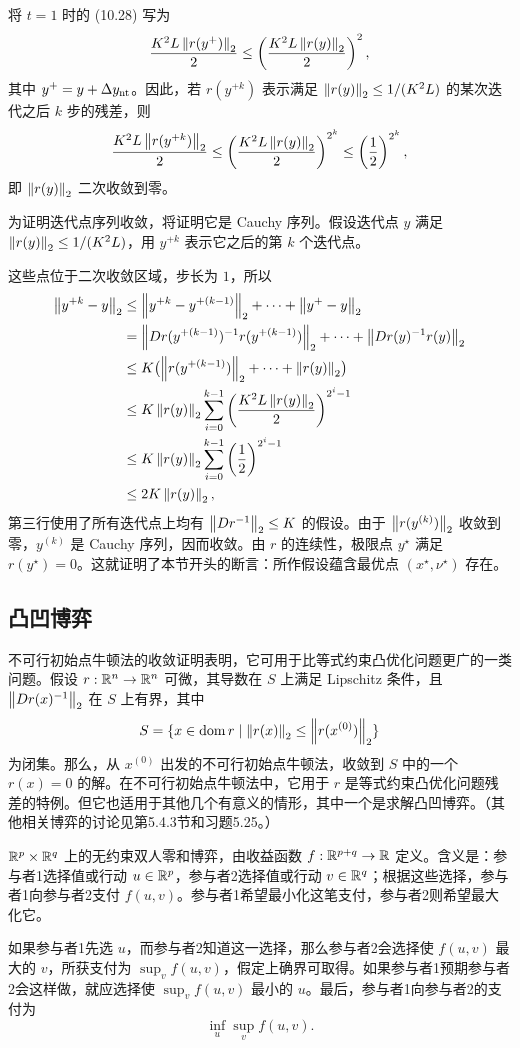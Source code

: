 将 $t=1$ 时的 (10.28) 写为
\[\frac{K^2L\left\lVert r(y^+)\right\rVert_2}{2}\le\left(\frac{K^2L\left\lVert r(y)\right\rVert_2}{2}\right)^2,\]
其中 $y^+=y+\Delta y_{\rm nt}$。因此，若 $r(y^{+k})$ 表示满足 $\left\lVert r(y)\right\rVert_2\le1/(K^2L)$ 的某次迭代之后 $k$ 步的残差，则
\[\frac{K^2L\left\lVert r(y^{+k})\right\rVert_2}{2}\le\left(\frac{K^2L\left\lVert r(y)\right\rVert_2}{2}\right)^{2^k}\le\left(\frac12\right)^{2^k},\]
即 $\left\lVert r(y)\right\rVert_2$ 二次收敛到零。

为证明迭代点序列收敛，将证明它是 Cauchy 序列。假设迭代点 $y$ 满足 $\left\lVert r(y)\right\rVert_2\le1/(K^2L)$，用 $y^{+k}$ 表示它之后的第 $k$ 个迭代点。

这些点位于二次收敛区域，步长为 $1$，所以
\[\begin{aligned}
\left\lVert y^{+k}-y\right\rVert_2&\le\left\lVert y^{+k}-y^{+(k-1)}\right\rVert_2+\cdots+\left\lVert y^+-y\right\rVert_2\\
&=\left\lVert Dr(y^{+(k-1)})^{-1}r(y^{+(k-1)})\right\rVert_2+\cdots+\left\lVert Dr(y)^{-1}r(y)\right\rVert_2\\
&\le K\bigl(\left\lVert r(y^{+(k-1)})\right\rVert_2+\cdots+\left\lVert r(y)\right\rVert_2\bigr)\\
&\le K\left\lVert r(y)\right\rVert_2\sum_{i=0}^{k-1}\left(\frac{K^2L\left\lVert r(y)\right\rVert_2}{2}\right)^{2^i-1}\\
&\le K\left\lVert r(y)\right\rVert_2\sum_{i=0}^{k-1}\left(\frac12\right)^{2^i-1}\\
&\le2K\left\lVert r(y)\right\rVert_2,
\end{aligned}\]
第三行使用了所有迭代点上均有 $\left\lVert Dr^{-1}\right\rVert_2\le K$ 的假设。由于 $\left\lVert r(y^{(k)})\right\rVert_2$ 收敛到零，$y^{(k)}$ 是 Cauchy 序列，因而收敛。由 $r$ 的连续性，极限点 $y^\star$ 满足 $r(y^\star)=0$。这就证明了本节开头的断言：所作假设蕴含最优点 $(x^\star,\nu^\star)$ 存在。

\subsection{凸凹博弈}
不可行初始点牛顿法的收敛证明表明，它可用于比等式约束凸优化问题更广的一类问题。假设 $r:\mathbb R^n\to\mathbb R^n$ 可微，其导数在 $S$ 上满足 Lipschitz 条件，且 $\left\lVert Dr(x)^{-1}\right\rVert_2$ 在 $S$ 上有界，其中
\[S=\{x\in\operatorname{dom} r\mid\left\lVert r(x)\right\rVert_2\le\left\lVert r(x^{(0)})\right\rVert_2\}\]
为闭集。那么，从 $x^{(0)}$ 出发的不可行初始点牛顿法，收敛到 $S$ 中的一个 $r(x)=0$ 的解。在不可行初始点牛顿法中，它用于 $r$ 是等式约束凸优化问题残差的特例。但它也适用于其他几个有意义的情形，其中一个是求解凸凹博弈。（其他相关博弈的讨论见第5.4.3节和习题5.25。）

$\mathbb R^p\times\mathbb R^q$ 上的无约束双人零和博弈，由收益函数 $f:\mathbb R^{p+q}\to\mathbb R$ 定义。含义是：参与者1选择值或行动 $u\in\mathbb R^p$，参与者2选择值或行动 $v\in\mathbb R^q$；根据这些选择，参与者1向参与者2支付 $f(u,v)$。参与者1希望最小化这笔支付，参与者2则希望最大化它。

如果参与者1先选 $u$，而参与者2知道这一选择，那么参与者2会选择使 $f(u,v)$ 最大的 $v$，所获支付为 $\sup_v f(u,v)$，假定上确界可取得。如果参与者1预期参与者2会这样做，就应选择使 $\sup_v f(u,v)$ 最小的 $u$。最后，参与者1向参与者2的支付为
\begin{equation}\inf_u\sup_v f(u,v).\tag{10.30}\end{equation}
